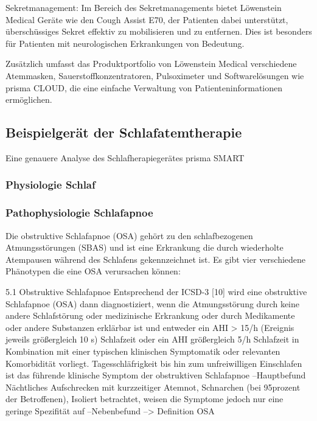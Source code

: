 \documentclass[a4paper, 12pt]{article}
\begin{document}
Sekretmanagement:
Im Bereich des Sekretmanagements bietet Löwenstein Medical Geräte wie den Cough Assist E70, der Patienten dabei unterstützt, überschüssiges Sekret effektiv zu mobilisieren und zu entfernen. Dies ist besonders für Patienten mit neurologischen Erkrankungen von Bedeutung.

Zusätzlich umfasst das Produktportfolio von Löwenstein Medical verschiedene Atemmasken, Sauerstoffkonzentratoren, Pulsoximeter und Softwarelösungen wie prisma CLOUD, die eine einfache Verwaltung von Patienteninformationen ermöglichen.

\newpage
\subsection{Beispielgerät der Schlafatemtherapie}\label{prismaSmart}
Eine genauere Analyse des Schlafherapiegerätes prisma SMART

\subsubsection{Physiologie Schlaf}

\subsubsection{Pathophysiologie Schlafapnoe}\label{schlafapnoe}
Die obstruktive Schlafapnoe (OSA) gehört zu den schlafbezogenen Atmungsstörungen (SBAS) und ist eine Erkrankung die durch wiederholte Atempausen während des Schlafens gekennzeichnet ist. Es gibt vier verschiedene Phänotypen die eine OSA verursachen können:

5.1 Obstruktive Schlafapnoe
Entsprechend der ICSD-3 [10] wird eine
obstruktive Schlafapnoe (OSA) dann diagnostiziert, wenn die Atmungsstörung
durch keine andere Schlafstörung oder
medizinische Erkrankung oder durch
Medikamente oder andere Substanzen
erklärbar ist und entweder ein AHI >
15/h (Ereignis jeweils größergleich 10 s) Schlafzeit oder ein AHI größergleich 5/h Schlafzeit in
Kombination mit einer typischen klinischen Symptomatik oder relevanten
Komorbidität vorliegt. 
Tagesschläfrigkeit bis hin zum unfreiwilligen Einschlafen ist das führende klinische Symptom der obstruktiven Schlafapnoe --Hauptbefund
Nächtliches Aufschrecken mit kurzzeitiger Atemnot, Schnarchen (bei 95prozent der Betroffenen),  Isoliert betrachtet, weisen die Symptome jedoch nur eine geringe Spezifität auf  --Nebenbefund
--> Definition OSA
\end{document}
